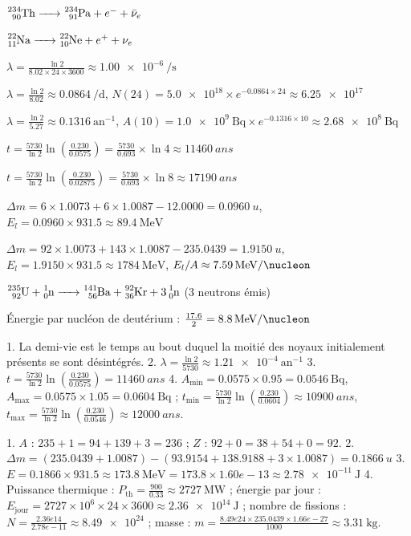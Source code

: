 $\ce{^{234}_{90}Th -> ^{234}_{91}Pa} + e^- + \bar{\nu}_e$

$\ce{^{22}_{11}Na -> ^{22}_{10}Ne} + e^+ + \nu_e$

$\lambda = \frac{\ln 2}{8.02 \times 24 \times 3600} \approx \SI{1.00e-6}{\per\second}$

$\lambda = \frac{\ln 2}{8.02} \approx \SI{0.0864}{\per\day}$, $N(24) = \num{5.0e18} \times e^{-0.0864 \times 24} \approx \num{6.25e17}$

$\lambda = \frac{\ln 2}{5.27} \approx \num{0.1316}~\mathrm{an}^{-1}$, $A(10) = \SI{1.0e9}{\becquerel} \times e^{-0.1316 \times 10} \approx \SI{2.68e8}{\becquerel}$

$t = \frac{5730}{\ln 2} \ln\left(\frac{0.230}{0.0575}\right) = \frac{5730}{0.693} \times \ln 4 \approx \SI{11460}{ans}$

$t = \frac{5730}{\ln 2} \ln\left(\frac{0.230}{0.02875}\right) = \frac{5730}{0.693} \times \ln 8 \approx \SI{17190}{ans}$

$\Delta m = 6 \times 1.0073 + 6 \times 1.0087 - 12.0000 = \SI{0.0960}{u}$, $E_l = 0.0960 \times 931.5 \approx \SI{89.4}{\MeV}$

$\Delta m = 92 \times 1.0073 + 143 \times 1.0087 - 235.0439 = \SI{1.9150}{u}$, $E_l = 1.9150 \times 931.5 \approx \SI{1784}{\MeV}$, $E_l/A \approx \SI{7.59}{\MeV\per\nucleon}$

$\ce{^{235}_{92}U + ^{1}_{0}n -> ^{141}_{56}Ba + ^{92}_{36}Kr + 3 ^{1}_{0}n}$ (3 neutrons émis)

Énergie par nucléon de deutérium : $\frac{17.6}{2} = \SI{8.8}{\MeV\per\nucleon}$

1. La demi-vie est le temps au bout duquel la moitié des noyaux initialement présents se sont désintégrés.
2. $\lambda = \frac{\ln 2}{5730} \approx \num{1.21e-4}~\mathrm{an}^{-1}$
3. $t = \frac{5730}{\ln 2} \ln\left(\frac{0.230}{0.0575}\right) = \SI{11460}{ans}$
4. $A_{\min} = 0.0575 \times 0.95 = \SI{0.0546}{\becquerel}$, $A_{\max} = 0.0575 \times 1.05 = \SI{0.0604}{\becquerel}$ ; $t_{\min} = \frac{5730}{\ln 2} \ln\left(\frac{0.230}{0.0604}\right) \approx \SI{10900}{ans}$, $t_{\max} = \frac{5730}{\ln 2} \ln\left(\frac{0.230}{0.0546}\right) \approx \SI{12000}{ans}$.

1. $A$ : $235+1 = 94+139+3 = 236$ ; $Z$ : $92+0 = 38+54+0 = 92$.
2. $\Delta m = (235.0439 + 1.0087) - (93.9154 + 138.9188 + 3 \times 1.0087) = \SI{0.1866}{u}$
3. $E = 0.1866 \times 931.5 \approx \SI{173.8}{\MeV} = 173.8 \times 1.60e-13 \approx \SI{2.78e-11}{\joule}$
4. Puissance thermique : $P_{\text{th}} = \frac{900}{0.33} \approx \SI{2727}{\mega\watt}$ ; énergie par jour : $E_{\text{jour}} = 2727 \times 10^6 \times 24 \times 3600 \approx \SI{2.36e14}{\joule}$ ; nombre de fissions : $N = \frac{2.36e14}{2.78e-11} \approx \num{8.49e24}$ ; masse : $m = \frac{8.49e24 \times 235.0439 \times 1.66e-27}{1000} \approx \SI{3.31}{\kilogram}$.


